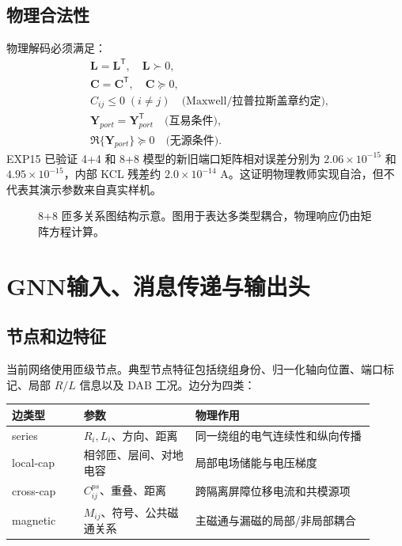 \documentclass[UTF8,11pt,a4paper]{ctexart}
\newcommand{\mat}[1]{\bm{#1}}
\begin{document}
\subsection{物理合法性}
物理解码必须满足：
\begin{align}
&\mat L=\mat L^{\mathsf T},\quad \mat L\succ0,\\
&\mat C=\mat C^{\mathsf T},\quad \mat C\succeq0,\\
&C_{ij}\le0\;(i\ne j)\quad\text{(Maxwell/拉普拉斯盖章约定)},\\
&\mat Y_{port}=\mat Y_{port}^{\mathsf T}\quad\text{(互易条件)},\\
&\Re\{\mat Y_{port}\}\succeq0\quad\text{(无源条件)}.
\end{align}
EXP15 已验证 4+4 和 8+8 模型的新旧端口矩阵相对误差分别为 $2.06\times10^{-15}$ 和 $4.95\times10^{-15}$，内部 KCL 残差约 $2.0\times10^{-14}$ A。这证明物理教师实现自洽，但不代表其演示参数来自真实样机。

\begin{figure}[H]
\centering
{}
\caption{8+8 匝多关系图结构示意。图用于表达多类型耦合，物理响应仍由矩阵方程计算。}
\end{figure}

\section{GNN输入、消息传递与输出头}

\subsection{节点和边特征}
当前网络使用匝级节点。典型节点特征包括绕组身份、归一化轴向位置、端口标记、局部 $R/L$ 信息以及 DAB 工况。边分为四类：
\begin{longtable}{p{0.18\linewidth}p{0.28\linewidth}p{0.45\linewidth}}
\toprule
边类型 & 参数 & 物理作用\\
\midrule
series & $R_i,L_i$、方向、距离 & 同一绕组的电气连续性和纵向传播\\
local-cap & 相邻匝、层间、对地电容 & 局部电场储能与电压梯度\\
cross-cap & $C_{ij}^{ps}$、重叠、距离 & 跨隔离屏障位移电流和共模源项\\
magnetic & $M_{ij}$、符号、公共磁通关系 & 主磁通与漏磁的局部/非局部耦合\\
\bottomrule
\end{longtable}
\end{document}
